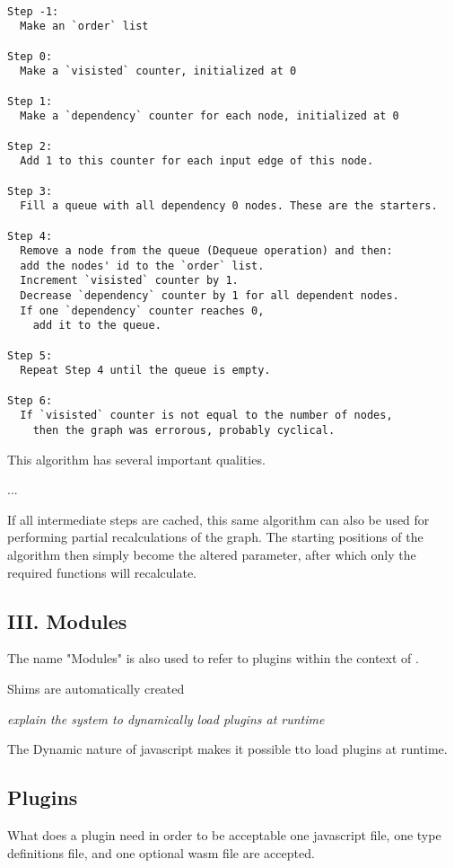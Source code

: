 \begin{lstlisting}

Step -1: 
  Make an `order` list

Step 0: 
  Make a `visisted` counter, initialized at 0

Step 1: 
  Make a `dependency` counter for each node, initialized at 0

Step 2: 
  Add 1 to this counter for each input edge of this node.

Step 3: 
  Fill a queue with all dependency 0 nodes. These are the starters.

Step 4: 
  Remove a node from the queue (Dequeue operation) and then:
  add the nodes' id to the `order` list.
  Increment `visisted` counter by 1.
  Decrease `dependency` counter by 1 for all dependent nodes.
  If one `dependency` counter reaches 0, 
    add it to the queue.

Step 5: 
  Repeat Step 4 until the queue is empty.

Step 6: 
  If `visisted` counter is not equal to the number of nodes, 
    then the graph was errorous, probably cyclical. 

\end{lstlisting}

This algorithm has several important qualities. 

...

If all intermediate steps are cached, this same algorithm can also be used for performing partial recalculations of the graph. 
The starting positions of the algorithm then simply become the altered parameter, after which only the required functions will recalculate. 


\subsection*{III. Modules} 


The name "Modules" is also used to refer to plugins within the context of \geofront{}.

Shims are automatically created

\emph{explain the system to dynamically load plugins at runtime}

The Dynamic nature of javascript makes it possible tto load plugins at runtime. 

  

\subsection{Plugins}
What does a plugin need in order to be acceptable
one javascript file, one type definitions file, and one optional wasm file are accepted. 

